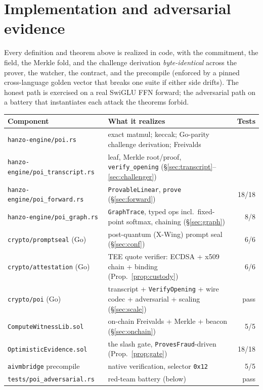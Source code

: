 \documentclass[11pt]{article}
\begin{document}
\section{Implementation and adversarial evidence}\label{sec:impl}

Every definition and theorem above is realized in code, with the commitment, the field, the Merkle
fold, and the challenge derivation \emph{byte-identical} across the prover, the watcher, the contract,
and the precompile (enforced by a pinned cross-language golden vector that breaks one suite if either
side drifts). The honest path is exercised on a real SwiGLU FFN forward; the adversarial path on a
battery that instantiates each attack the theorems forbid.

\begin{longtable}{@{}p{}p{}r@{}}
\toprule
Component & What it realizes & Tests \\
\midrule
\texttt{hanzo-engine/poi.rs} & exact matmul; keccak; Go-parity challenge derivation; Freivalds & \\
\texttt{hanzo-engine/poi\_transcript.rs} & leaf, Merkle root/proof, \texttt{verify\_opening} (\S\ref{sec:transcript}--\ref{sec:challenger}) & \\
\texttt{hanzo-engine/poi\_forward.rs} & \texttt{ProvableLinear}, \texttt{prove} (\S\ref{sec:forward}) & 18/18 \\
\texttt{hanzo-engine/poi\_graph.rs} & \texttt{GraphTrace}, typed ops incl.\ fixed-point softmax, chaining (\S\ref{sec:graph}) & 8/8 \\
\texttt{crypto/promptseal} (Go) & post-quantum (X-Wing) prompt seal (\S\ref{sec:conf}) & 6/6 \\
\texttt{crypto/attestation} (Go) & TEE quote verifier: ECDSA + x509 chain + binding (Prop.~\ref{prop:custody}) & 6/6 \\
\texttt{crypto/poi} (Go) & transcript + \texttt{VerifyOpening} + wire codec + adversarial + scaling (\S\ref{sec:scale}) & pass \\
\texttt{ComputeWitnessLib.sol} & on-chain Freivalds + Merkle + beacon (\S\ref{sec:onchain}) & 5/5 \\
\texttt{OptimisticEvidence.sol} & the slash gate, \texttt{ProvesFraud}-driven (Prop.~\ref{prop:gate}) & 18/18 \\
\texttt{aivmbridge} precompile & native verification, selector \texttt{0x12} & 5/5 \\
\texttt{tests/poi\_adversarial.rs} & red-team battery (below) & pass \\
\bottomrule
\end{longtable}
\end{document}

